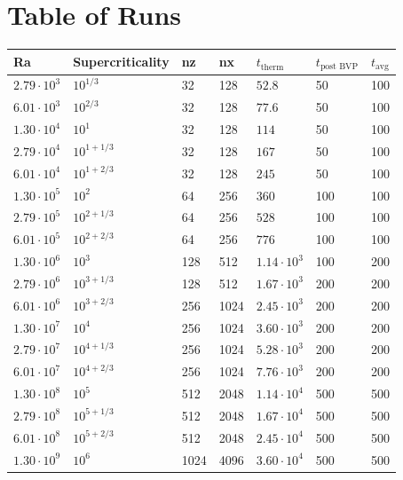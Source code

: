 \documentclass[aps, pre, onecolumn, nofootinbib, notitlepage, groupedaddress, amsfonts, amssymb, amsmath, longbibliography]{revtex4-1}
\begin{document}
\appendix
\section{Table of Runs}
\begin{center}
\begin{tabularx}{\textwidth}{ X X X X X X X }
\hline													
Ra	&	Supercriticality	&	nz	&	nx	&	$t_{\text{therm}}$	&	$t_{\text{post BVP}}$	&	$t_{\text{avg}}$	\\[1ex]
\hline		\hline											
$2.79 \cdot 10^3$	&	$10^{1/3}$	&	32	&	128	&	$52.8$	&	50	&	100	\\
$6.01 \cdot 10^3$	&	$10^{2/3}$	&	32	&	128	&	$77.6$	&	50	&	100	\\
$1.30 \cdot 10^4$	&	$10^1$	&	32	&	128	&	$114$	&	50	&	100	\\
$2.79 \cdot 10^4$	&	$10^{1 + 1/3}$	&	32	&	128	&	$167$	&	50	&	100	\\
$6.01 \cdot 10^4$	&	$10^{1 + 2/3}$	&	32	&	128	&	$245$	&	50	&	100	\\
$1.30 \cdot 10^5$	&	$10^2$	&	64	&	256	&	$360$	&	100	&	100	\\
$2.79 \cdot 10^5$	&	$10^{2 + 1/3}$	&	64	&	256	&	$528$	&	100	&	100	\\
$6.01 \cdot 10^5$	&	$10^{2 + 2/3}$	&	64	&	256	&	$776$	&	100	&	100	\\
$1.30 \cdot 10^6$	&	$10^3$	&	128	&	512	&	$1.14 \cdot 10^3$	&	100	&	200	\\
$2.79 \cdot 10^6$	&	$10^{3 + 1/3}$	&	128	&	512	&	$1.67 \cdot 10^3$	&	200	&	200	\\
$6.01 \cdot 10^6$	&	$10^{3 + 2/3}$	&	256	&	1024	&	$2.45 \cdot 10^3$	&	200	&	200	\\
$1.30 \cdot 10^7$	&	$10^4$	&	256	&	1024	&	$3.60 \cdot 10^3$	&	200	&	200	\\
$2.79 \cdot 10^7$	&	$10^{4 + 1/3}$	&	256	&	1024	&	$5.28 \cdot 10^3$	&	200	&	200	\\
$6.01 \cdot 10^7$	&	$10^{4 + 2/3}$	&	256	&	1024	&	$7.76 \cdot 10^3$	&	200	&	200	\\
$1.30 \cdot 10^8$	&	$10^5$	&	512	&	2048	&	$1.14 \cdot 10^4$	&	500	&	500	\\
$2.79 \cdot 10^8$	&	$10^{5 + 1/3}$	&	512	&	2048	&	$1.67 \cdot 10^4$	&	500	&	500	\\
$6.01 \cdot 10^8$	&	$10^{5 + 2/3}$	&	512	&	2048	&	$2.45 \cdot 10^4$	&	500	&	500	\\
$1.30 \cdot 10^9$	&	$10^6$	&	1024	&	4096	&	$3.60 \cdot 10^4$	&	500	&	500	\\
\hline													
\end{tabularx}
\end{center}




\end{document}

